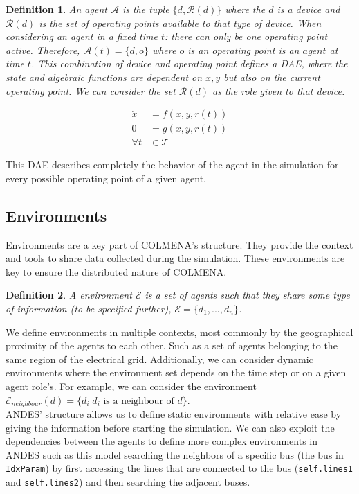 \documentclass{report}
\newtheorem{definition}{Definition}
\begin{document}
\begin{definition}
    An agent $\mathcal{A}$ is the tuple $\{d, \mathcal{R}(d)\}$ where the $d$ is a device and $\mathcal{R}(d)$ is the set of operating points available to that type of device. When considering an agent in a fixed time $t$: there can only be one operating point active. Therefore, $\mathcal{A}(t) = \{d, o\}$ where $o$ is an operating point is an $agent$ at time $t$. This combination of device and operating point defines a DAE, where the state and algebraic functions are dependent on $x,y$ but also on the current operating point. We can consider the set $\mathcal{R}(d)$ as the role given to that device.
\end{definition}
\begin{align}
    \dot{x} &= f(x, y, r(t))\\
    0 &= g(x, y, r(t))\\
    \forall t &\in \mathcal{T}
\end{align}

This DAE describes completely the behavior of the agent in the simulation for every possible operating point of a given agent.

\subsection{Environments}

Environments are a key part of COLMENA's structure. They provide the context and tools to share data collected during the simulation. These environments are key to ensure the distributed nature of COLMENA.

\begin{definition}
    A environment $\mathcal{E}$ is a set of agents such that they share some type of information
    (to be specified further), $\mathcal{E}= \{ d_1, ..., d_n\}$. 
\end{definition}

We define environments in multiple contexts, most commonly by the geographical proximity of the agents to each other. Such as a set of agents belonging to the same region of the electrical grid. Additionally, we can consider dynamic environments where the environment set depends on the time step or on a given agent role's. For example, we can consider the environment $\mathcal{E}_{neighbour}(d) = \{ d_i| d_i \text{ is a neighbour  of } d\}$.\\

ANDES' structure allows us to define static environments with relative ease by giving the information before starting the simulation. We can also exploit the dependencies between the agents to define more complex environments in ANDES such as this model searching the neighbors of a specific bus (the bus in \texttt{IdxParam}) by first accessing the lines that are connected to the bus (\texttt{self.lines1} and \texttt{self.lines2}) and then searching the adjacent buses.
    
\end{document}
